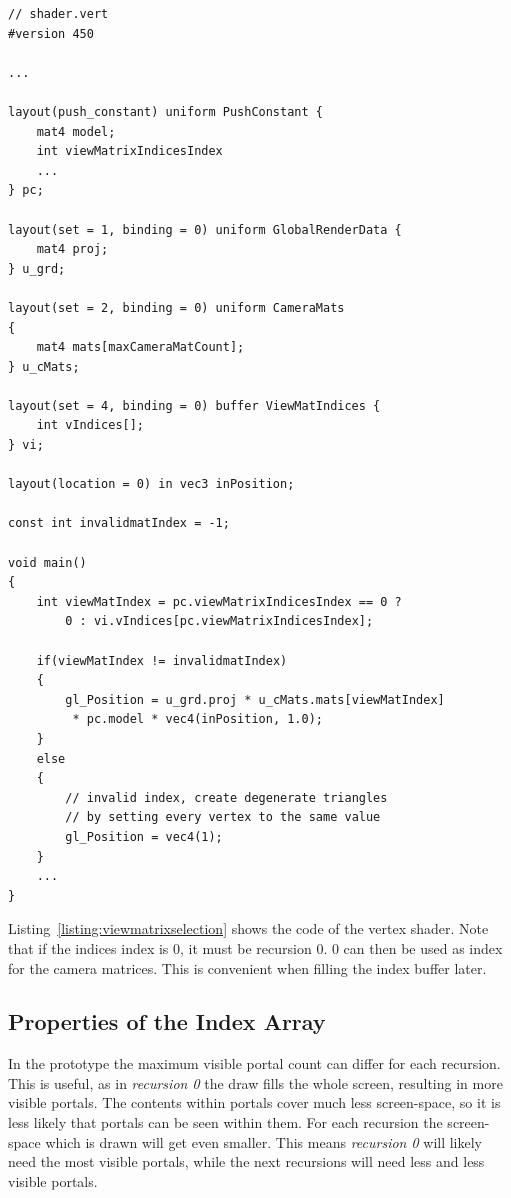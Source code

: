 \begin{lstlisting}[caption={View Matrix Selection}, label=listing:viewmatrixselection]
// shader.vert
#version 450

...

layout(push_constant) uniform PushConstant {	
	mat4 model;
	int viewMatrixIndicesIndex
	...
} pc;

layout(set = 1, binding = 0) uniform GlobalRenderData {
	mat4 proj;
} u_grd;

layout(set = 2, binding = 0) uniform CameraMats
{
	mat4 mats[maxCameraMatCount];
} u_cMats;

layout(set = 4, binding = 0) buffer ViewMatIndices {
	int vIndices[];
} vi;

layout(location = 0) in vec3 inPosition;

const int invalidmatIndex = -1;

void main()
{
	int viewMatIndex = pc.viewMatrixIndicesIndex == 0 ? 
		0 : vi.vIndices[pc.viewMatrixIndicesIndex];
	
	if(viewMatIndex != invalidmatIndex)
	{
		gl_Position = u_grd.proj * u_cMats.mats[viewMatIndex]
		 * pc.model * vec4(inPosition, 1.0);
	}
	else
	{
		// invalid index, create degenerate triangles
		// by setting every vertex to the same value
		gl_Position = vec4(1);
	}
	...
}

\end{lstlisting}

Listing~\ref{listing:viewmatrixselection} shows the code of the vertex shader. Note that if the indices index is 0, it must be recursion 0. 0 can then be used as index for the camera matrices. This is convenient when filling the index buffer later.

\subsection{Properties of the Index Array}
\label{section:indexarrayproperties}

In the prototype the maximum visible portal count can differ for each recursion. This is useful, as in \textit{recursion 0} the draw fills the whole screen, resulting in more visible portals. The contents within portals cover much less screen-space, so it is less likely that portals can be seen within them. For each recursion the screen-space which is drawn will get even smaller. This means \textit{recursion 0} will likely need the most visible portals, while the next recursions will need less and less visible portals.


